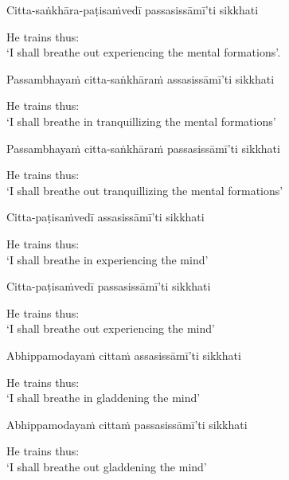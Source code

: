 Citta-saṅkhāra-paṭisaṁvedī passasissāmī'ti sikkhati

\begin{english}
  He trains thus:\\
  `I shall breathe out experiencing the mental formations'.
\end{english}

Passambhayaṁ citta-saṅkhāraṁ assasissāmī'ti sikkhati

\begin{english}
  He trains thus:\\
  `I shall breathe in tranquillizing the mental formations'\makeatletter\hyperlink{endnote70-appendix}\makeatother
\end{english}

Passambhayaṁ citta-saṅkhāraṁ passasissāmī'ti sikkhati

\begin{english}
  He trains thus:\\
  `I shall breathe out tranquillizing the mental formations'
\end{english}

Citta-paṭisaṁvedī assasissāmī'ti sikkhati

\begin{english}
  He trains thus:\\
  `I shall breathe in experiencing the mind'
\end{english}

Citta-paṭisaṁvedī passasissāmī'ti sikkhati

\begin{english}
  He trains thus:\\
  `I shall breathe out experiencing the mind'
\end{english}

Abhippamodayaṁ cittaṁ assasissāmī'ti sikkhati

\begin{english}
  He trains thus:\\
  `I shall breathe in gladdening the mind'
\end{english}

Abhippamodayaṁ cittaṁ passasissāmī'ti sikkhati

\begin{english}
  He trains thus:\\
  `I shall breathe out gladdening the mind'
\end{english}

